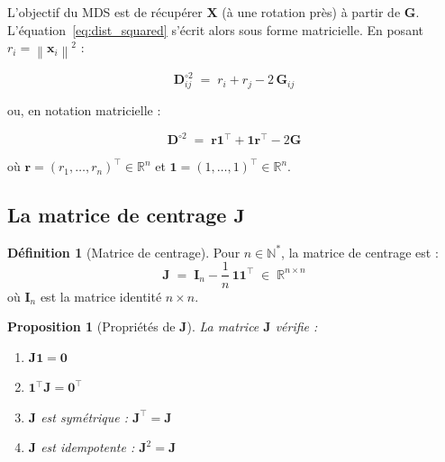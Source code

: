 \documentclass[12pt, a4paper]{article}
\theoremstyle{plain}
\newtheorem{proposition}[theorem]{Proposition}
\theoremstyle{definition}
\newtheorem{definition}[theorem]{Définition}
\newcommand{\R}{\mathbb{R}}
\newcommand{\N}{\mathbb{N}}
\newcommand{\norm}[1]{\left\lVert #1 \right\rVert}
\newcommand{\mat}[1]{\mathbf{#1}}
\newcommand{\vect}[1]{\mathbf{#1}}
\newcommand{\ones}{\mathbf{1}}
\newcommand{\Gram}{\mat{G}}
\newcommand{\Dsq}{\mat{D}^{\circ 2}}
\newcommand{\Jmat}{\mat{J}}
\begin{document}
L'objectif du MDS est de récupérer $\mat{X}$ (à une rotation près) à partir
de $\mat{G}$. L'équation~\eqref{eq:dist_squared} s'écrit alors sous forme
matricielle. En posant $r_i = \norm{\vect{x}_i}^2$ :

\begin{equation}
    \Dsq_{ij} \;=\; r_i + r_j - 2\,\Gram_{ij}
    \label{eq:gram_dist}
\end{equation}

ou, en notation matricielle :

\begin{equation}
    \Dsq \;=\; \vect{r}\ones^\top + \ones\vect{r}^\top - 2\Gram
    \label{eq:gram_dist_matrix}
\end{equation}

où $\vect{r} = (r_1, \ldots, r_n)^\top \in \R^n$ et $\ones = (1,\ldots,1)^\top
\in \R^n$.

\subsection{La matrice de centrage \texorpdfstring{$\Jmat$}{J}}

\begin{definition}[Matrice de centrage]
    Pour $n \in \N^*$, la matrice de centrage est :
    \begin{equation}
        \Jmat \;=\; \mat{I}_n - \frac{1}{n}\,\ones\ones^\top \;\in\; \R^{n\times n}
    \end{equation}
    où $\mat{I}_n$ est la matrice identité $n\times n$.
\end{definition}

\begin{proposition}[Propriétés de $\Jmat$]\label{prop:J}
    La matrice $\Jmat$ vérifie :
    \begin{enumerate}
        \item[\rm(i)] $\Jmat\ones = \vect{0}$
        \item[\rm(ii)] $\ones^\top\Jmat = \vect{0}^\top$
        \item[\rm(iii)] $\Jmat$ est symétrique : $\Jmat^\top = \Jmat$
        \item[\rm(iv)] $\Jmat$ est idempotente : $\Jmat^2 = \Jmat$
    \end{enumerate}
\end{proposition}
\end{document}

